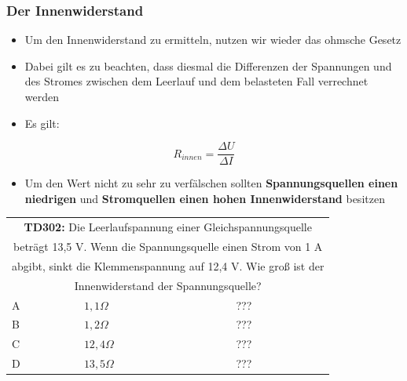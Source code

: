 \begin{frame}
	\frametitle{Der Innenwiderstand}
	\begin{itemize}
		\item	Um den Innenwiderstand zu ermitteln, nutzen wir wieder das ohmsche Gesetz
		\item	Dabei gilt es zu beachten, dass diesmal die Differenzen der Spannungen und des Stromes zwischen dem Leerlauf und dem belasteten Fall verrechnet werden
		\item	Es gilt:
	\end{itemize}
	\begin{equation}
		R_{innen} = \frac{\Delta U}{\Delta I}
	\end{equation}
	\begin{itemize}
		\item Um den Wert nicht zu sehr zu verfälschen sollten \textbf{Spannungsquellen einen niedrigen} und \textbf{Stromquellen einen hohen Innenwiderstand} besitzen
	\end{itemize}
\end{frame}

\begin{frame}
	\begin{small}	
	\begin{tabular}{|l|l|l|}
	\hline
		\multicolumn{3}{|c|}{\textbf{TD302:} Die Leerlaufspannung einer Gleichspannungsquelle}\\
		\multicolumn{3}{|c|}{beträgt 13,5 V. Wenn die Spannungsquelle einen Strom von 1 A}\\
		\multicolumn{3}{|c|}{abgibt, sinkt die Klemmenspannung auf 12,4 V. Wie groß ist der}\\			\multicolumn{3}{|c|}{Innenwiderstand der Spannungsquelle?}\\
		\hline
		A & $1,1 \Omega$ & ??? \\ \hline
		B & $1,2 \Omega$ & ??? \\ \hline
		C & $12,4 \Omega$ & ??? \\ \hline
		D & $13,5 \Omega$ & ??? \\ \hline 		
	\end{tabular}
	\end{small}
\end{frame}

